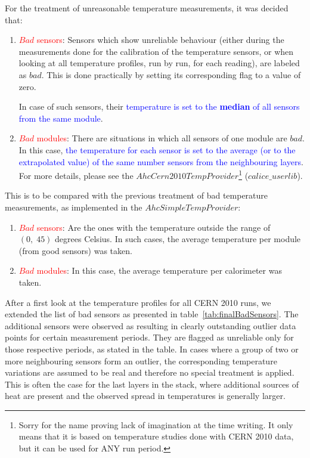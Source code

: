 \documentclass[a4paper,10pt]{article}
\begin{document}
For the treatment of unreasonable temperature measurements, it was decided that:
\begin{enumerate}
 \item \textcolor{red}{$Bad$ sensors}: Sensors which show unreliable behaviour (either during the measurements done for the calibration of the temperature sensors, or when looking at all temperature profiles, run by run, for each reading), are labeled as $bad$. This is done practically by setting its corresponding flag to a value of zero.

In case of such sensors, their \textcolor{blue}{temperature is set to the \textbf{median} of all sensors from the same module}.

\item \textcolor{red}{$Bad$ modules}: There are situations in which all sensors of one module are $bad$. In this case, \textcolor{blue}{the temperature for each sensor is set to the average (or to the extrapolated value) of the same number sensors from the neighbouring layers}. For more details, please see the $AhcCern2010TempProvider$\footnote{Sorry for the name
proving lack of imagination at the time writing. It only means that it is based on temperature
   studies done with CERN 2010 data, but it can be used for ANY run period.} ($calice\_userlib$).

\end{enumerate}

This is to be compared with the previous treatment of bad temperature measurements, as implemented in the $AhcSimpleTempProvider$:
\begin{enumerate}
 \item \textcolor{red}{$Bad$ sensors}: Are the ones with the temperature outside the range of $(0, \; 45)$ degrees Celsius. In such cases, the average temperature per module (from good sensors) was taken.

 \item \textcolor{red}{$Bad$ modules}: In this case, the average temperature per calorimeter was taken.
\end{enumerate}


After a first look at the temperature profiles for all CERN 2010 runs, we extended the list of bad sensors as presented in table~\ref{tab:finalBadSensors}. The additional sensors were observed as resulting in clearly outstanding 
outlier data points for certain 
measurement periods. They are flagged as unreliable only for those respective periods, as stated in the table. 
In cases where a group of two or more neighbouring sensors form an outlier, the corresponding temperature variations are 
assumed to be real and therefore no special treatment is applied. This is often the case for the last layers in the stack,
where additional sources of heat are present and the observed spread in temperatures is generally larger.
\end{document}
